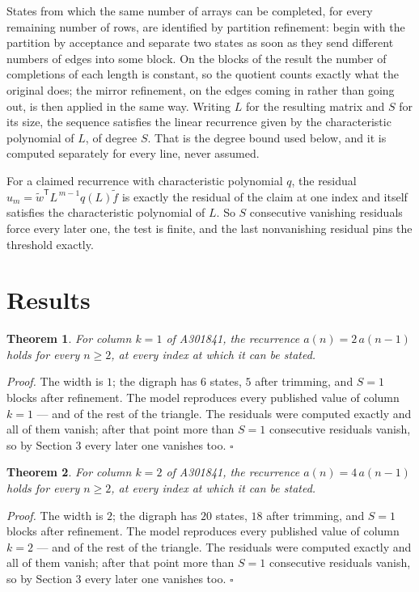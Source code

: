 \documentclass[11pt]{article}
\newtheorem{theorem}{Theorem}
\theoremstyle{definition}
\begin{document}
States from which the same number of arrays can be completed, for every remaining number of rows, are identified by partition refinement: begin with the partition by acceptance and separate two states as soon as they send different numbers of edges into some block. On the blocks of the result the number of completions of each length is constant, so the quotient counts exactly what the original does; the mirror refinement, on the edges coming in rather than going out, is then applied in the same way. Writing $L$ for the resulting matrix and $S$ for its size, the sequence satisfies the linear recurrence given by the characteristic polynomial of $L$, of degree $S$. That is the degree bound used below, and it is computed separately for every line, never assumed.

For a claimed recurrence with characteristic polynomial $q$, the residual $u_m = \tilde w^{\mathsf T}L^{\,m-1}q(L)\tilde f$ is exactly the residual of the claim at one index and itself satisfies the characteristic polynomial of $L$. So $S$ consecutive vanishing residuals force every later one, the test is finite, and the last nonvanishing residual pins the threshold exactly.

\section{Results}

\begin{theorem} For column $k = 1$ of A301841, the recurrence $a(n) = 2\,a(n-1)$ holds for every $n \ge 2$, at every index at which it can be stated.\end{theorem}

{\itshape Proof.} The width is $1$; the digraph has $6$ states, $5$ after trimming, and $S = 1$ blocks after refinement. The model reproduces every published value of column $k = 1$ --- and of the rest of the triangle. The residuals were computed exactly and all of them vanish; after that point more than $S = 1$ consecutive residuals vanish, so by Section 3 every later one vanishes too. $\square$

\begin{theorem} For column $k = 2$ of A301841, the recurrence $a(n) = 4\,a(n-1)$ holds for every $n \ge 2$, at every index at which it can be stated.\end{theorem}

{\itshape Proof.} The width is $2$; the digraph has $20$ states, $18$ after trimming, and $S = 1$ blocks after refinement. The model reproduces every published value of column $k = 2$ --- and of the rest of the triangle. The residuals were computed exactly and all of them vanish; after that point more than $S = 1$ consecutive residuals vanish, so by Section 3 every later one vanishes too. $\square$
\end{document}
